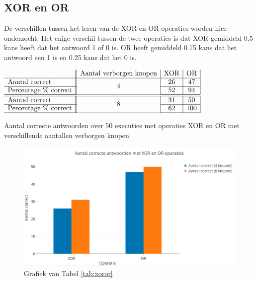 \subsection{XOR en OR}
De verschillen tussen het leren van de XOR en OR operaties worden hier onderzocht. Het enige verschil tussen de twee operaties is dat XOR gemiddeld 0.5 kans heeft dat het antwoord 1 of 0 is. OR heeft gemiddeld 0.75 kans dat het antwoord een 1 is en 0.25 kans dat het 0 is.

\begin{table}[ht]
    \centering
      $\begin{array}{l || c | c | c | c}
                                    & \text{Aantal verborgen knopen} & \text{XOR} & \text{OR} \\ \hline
        \text{Aantal correct}       & \multirow{2}{*}{4}  & 26 & 47 \\ \cline{1-1} \cline{3-4}
        \text{Percentage \% correct} &                    & 52 & 94 \\ \cline{1-1} \cline{3-4} \hline \hline
        \text{Aantal correct}       & \multirow{2}{*}{8} & 31 & 50 \\ \cline{1-1} \cline{3-4}
        \text{Percentage \% correct} &                    & 62 & 100 \\ \cline{1-1} \cline{3-4} \hline
      \end{array}$
    \caption{Aantal correcte antwoorden over 50 executies met operaties XOR en OR met verschillende aantallen verborgen knopen}
    \label{tab:xoror}
\end{table}

\begin{figure}[ht!]
    \centering
    \includegraphics[scale=0.3]{graphs/xoror.png}
    \caption{Grafiek van Tabel \ref{tab:xoror}}
    \label{fig:xoror}
\end{figure}
